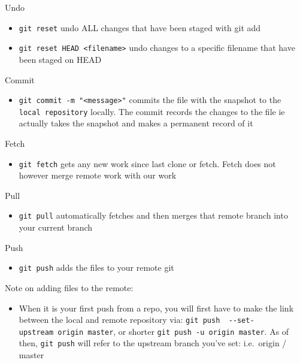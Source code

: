 \documentclass[
]{book}
\providecommand{\tightlist}{%
  \setlength{\itemsep}{0pt}\setlength{\parskip}{0pt}}
\begin{document}
Undo

\begin{itemize}
\tightlist
\item
  \texttt{git\ reset} undo ALL changes that have been staged with git add
\item
  \texttt{git\ reset\ HEAD\ \textless{}filename\textgreater{}} undo changes to a specific filename that have been staged on HEAD
\end{itemize}

Commit

\begin{itemize}
\tightlist
\item
  \texttt{git\ commit\ -m\ "\textless{}message\textgreater{}"} commits the file with the snapshot to the \texttt{local\ repository} locally. The commit records the changes to the file ie actually takes the snapshot and makes a permanent record of it
\end{itemize}

Fetch

\begin{itemize}
\tightlist
\item
  \texttt{git\ fetch} gets any new work since last clone or fetch. Fetch does not however merge remote work with our work
\end{itemize}

Pull

\begin{itemize}
\tightlist
\item
  \texttt{git\ pull} automatically fetches and then merges that remote branch into your current branch
\end{itemize}

Push

\begin{itemize}
\tightlist
\item
  \texttt{git\ push} adds the files to your remote git
\end{itemize}

Note on adding files to the remote:

\begin{itemize}
\tightlist
\item
  When it is your first push from a repo, you will first have to make the link between the local and remote repository via: \texttt{git\ push\ \ -\/-set-upstream\ origin\ master}, or shorter \texttt{git\ push\ -u\ origin\ master}. As of then, \texttt{git\ push} will refer to the upstream branch you've set: i.e.~origin / master
\end{itemize}
\end{document}

